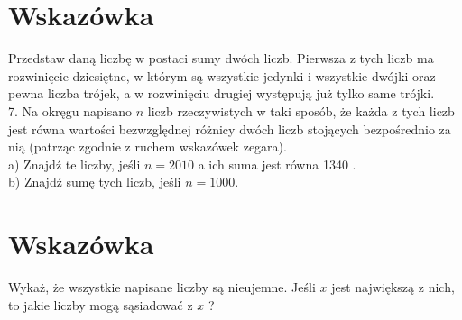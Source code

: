 \documentclass[10pt]{article}
\begin{document}
\section*{Wskazówka}
Przedstaw daną liczbę w postaci sumy dwóch liczb. Pierwsza z tych liczb ma rozwinięcie dziesiętne, w którym są wszystkie jedynki i wszystkie dwójki oraz pewna liczba trójek, a w rozwinięciu drugiej występują już tylko same trójki.\\
7. Na okręgu napisano \(n\) liczb rzeczywistych w taki sposób, że każda z tych liczb jest równa wartości bezwzględnej różnicy dwóch liczb stojących bezpośrednio za nią (patrząc zgodnie z ruchem wskazówek zegara).\\
a) Znajdź te liczby, jeśli \(n=2010\) a ich suma jest równa 1340 .\\
b) Znajdź sumę tych liczb, jeśli \(n=1000\).

\section*{Wskazówka}
Wykaż, że wszystkie napisane liczby są nieujemne. Jeśli \(x\) jest największą z nich, to jakie liczby mogą sąsiadować z \(x\) ?
\end{document}
